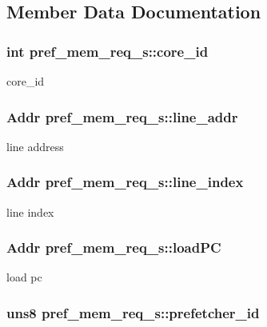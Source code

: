 \subsection{Member Data Documentation}
\hypertarget{structpref__mem__req__s_adfb942d07929f0399b15867437d1c481}{
\subsubsection[{core\_\-id}]{\setlength{\rightskip}{0pt plus 5cm}int {\bf pref\_\-mem\_\-req\_\-s::core\_\-id}}}
\label{structpref__mem__req__s_adfb942d07929f0399b15867437d1c481}
core\_\-id \hypertarget{structpref__mem__req__s_aa08c0000b0533eac7fbb75054399e236}{
\subsubsection[{line\_\-addr}]{\setlength{\rightskip}{0pt plus 5cm}Addr {\bf pref\_\-mem\_\-req\_\-s::line\_\-addr}}}
\label{structpref__mem__req__s_aa08c0000b0533eac7fbb75054399e236}
line address \hypertarget{structpref__mem__req__s_ad208a512a0ad9d988fdf5be679c3fb46}{
\subsubsection[{line\_\-index}]{\setlength{\rightskip}{0pt plus 5cm}Addr {\bf pref\_\-mem\_\-req\_\-s::line\_\-index}}}
\label{structpref__mem__req__s_ad208a512a0ad9d988fdf5be679c3fb46}
line index \hypertarget{structpref__mem__req__s_acfd65621ea0aeda3d983556b62469367}{
\subsubsection[{loadPC}]{\setlength{\rightskip}{0pt plus 5cm}Addr {\bf pref\_\-mem\_\-req\_\-s::loadPC}}}
\label{structpref__mem__req__s_acfd65621ea0aeda3d983556b62469367}
load pc \hypertarget{structpref__mem__req__s_a56208adb8dd71d2a86279e86994622cd}{
\subsubsection[{prefetcher\_\-id}]{\setlength{\rightskip}{0pt plus 5cm}uns8 {\bf pref\_\-mem\_\-req\_\-s::prefetcher\_\-id}}}
